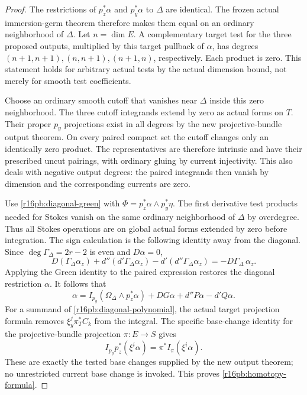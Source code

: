 \begin{proof}
The restrictions of $p_z^*\alpha$ and $p_y^*\alpha$ to $\Delta$
are identical. The frozen actual immersion-germ theorem therefore
makes them equal on an ordinary neighborhood of $\Delta$.
Let $n=\dim E$. A complementary target test for the three proposed
outputs, multiplied by this target pullback of $\alpha$, has degrees
$(n+1,n+1),(n,n+1),(n+1,n)$, respectively. Each product is zero.
This statement holds for arbitrary actual tests by the actual
dimension bound, not merely for smooth test coefficients.

Choose an ordinary smooth cutoff that vanishes near $\Delta$ inside
this zero neighborhood. The three cutoff integrands extend by zero
as actual forms on $T$. Their proper $p_y$ projections exist in all
degrees by the new projective-bundle output theorem. On every paired
compact set the cutoff changes only an identically zero product.
The representatives are therefore intrinsic and have their prescribed
uncut pairings, with ordinary gluing by current injectivity. This
also deals with negative output degrees: the paired integrands then
vanish by dimension and the corresponding currents are zero.

Use \eqref{r16pb:diagonal-green} with
$\Phi=p_z^*\alpha\wedge p_y^*\eta$. The first derivative test
products needed for Stokes vanish on the same ordinary neighborhood
of $\Delta$ by overdegree. Thus all Stokes operations are on global
actual forms extended by zero before integration. The sign calculation
is the following identity away from the diagonal. Since
$\deg\Gamma_\Delta=2r-2$ is even and $D\alpha=0$,
\[
 D(\Gamma_\Delta\alpha_z)
 +d''(d'\Gamma_\Delta\alpha_z)
 -d'(d''\Gamma_\Delta\alpha_z)
                      =-D\Gamma_\Delta\,\alpha_z.
 \tag{PB16.5}\label{r16pb:sign}
\]
Applying the Green identity to the paired expression restores the
diagonal restriction $\alpha$. It follows that
\[
 \alpha=I_{p_y}(\Omega_\Delta\wedge p_z^*\alpha)
                     +DG\alpha+d''P\alpha-d'Q\alpha.
\]
For a summand of \eqref{r16pb:diagonal-polynomial}, the actual target
projection formula removes $\xi_y^j\pi_T^*C_k$ from the integral.
The specific base-change identity for the projective-bundle projection
$\pi:E\to S$ gives
\[
 I_{p_y}p_z^*(\xi^i\alpha)=\pi^*I_\pi(\xi^i\alpha).
\]
These are exactly the tested base changes supplied by the new output
theorem; no unrestricted current base change is invoked. This proves
\eqref{r16pb:homotopy-formula}.
\end{proof}

